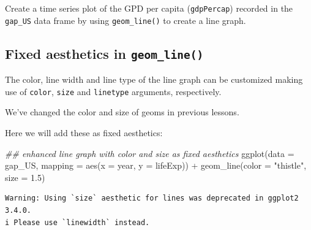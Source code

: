 \documentclass[
  letterpaper,
  DIV=11,
  numbers=noendperiod]{scrreprt}
\newenvironment{Shaded}{\begin{snugshade}}{\end{snugshade}}
\newcommand{\AttributeTok}[1]{\textcolor[rgb]{0.40,0.45,0.13}{#1}}
\newcommand{\DocumentationTok}[1]{\textcolor[rgb]{0.37,0.37,0.37}{\textit{#1}}}
\newcommand{\FloatTok}[1]{\textcolor[rgb]{0.68,0.00,0.00}{#1}}
\newcommand{\FunctionTok}[1]{\textcolor[rgb]{0.28,0.35,0.67}{#1}}
\newcommand{\NormalTok}[1]{\textcolor[rgb]{0.00,0.23,0.31}{#1}}
\newcommand{\SpecialCharTok}[1]{\textcolor[rgb]{0.37,0.37,0.37}{#1}}
\newcommand{\StringTok}[1]{\textcolor[rgb]{0.13,0.47,0.30}{#1}}
\begin{document}
\begin{tcolorbox}[enhanced jigsaw, title=\textcolor{quarto-callout-tip-color}{\faLightbulb}\hspace{0.5em}{Practice}, colbacktitle=quarto-callout-tip-color!10!white, leftrule=.75mm, arc=.35mm, opacityback=0, bottomrule=.15mm, rightrule=.15mm, toptitle=1mm, breakable, toprule=.15mm, colback=white, coltitle=black, colframe=quarto-callout-tip-color-frame, bottomtitle=1mm, titlerule=0mm, left=2mm, opacitybacktitle=0.6]

Create a time series plot of the GPD per capita (\texttt{gdpPercap})
recorded in the \texttt{gap\_US} data frame by using
\texttt{geom\_line()} to create a line graph.

\end{tcolorbox}

\subsection{\texorpdfstring{Fixed aesthetics in
\texttt{geom\_line()}}{Fixed aesthetics in geom\_line()}}\label{fixed-aesthetics-in-geom_line}

The color, line width and line type of the line graph can be customized
making use of \texttt{color}, \texttt{size} and \texttt{linetype}
arguments, respectively.

We've changed the color and size of geoms in previous lessons.

Here we will add these as fixed aesthetics:

\begin{Shaded}
\begin{Highlighting}[]
\DocumentationTok{\#\# enhanced line graph with color and size as fixed aesthetics}
\FunctionTok{ggplot}\NormalTok{(}\AttributeTok{data =}\NormalTok{ gap\_US, }
       \AttributeTok{mapping =} \FunctionTok{aes}\NormalTok{(}\AttributeTok{x =}\NormalTok{ year, }
                     \AttributeTok{y =}\NormalTok{ lifeExp)) }\SpecialCharTok{+}
  \FunctionTok{geom\_line}\NormalTok{(}\AttributeTok{color =} \StringTok{"thistle"}\NormalTok{,}
            \AttributeTok{size =} \FloatTok{1.5}\NormalTok{) }
\end{Highlighting}
\end{Shaded}

\begin{verbatim}
Warning: Using `size` aesthetic for lines was deprecated in ggplot2 3.4.0.
i Please use `linewidth` instead.
\end{verbatim}
\end{document}
